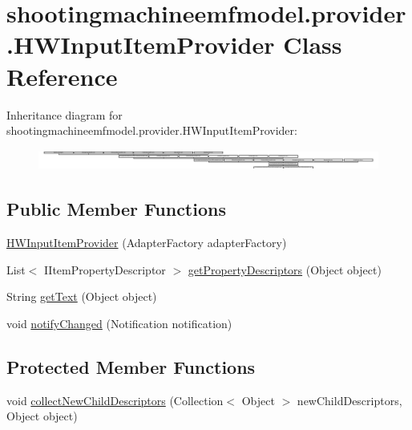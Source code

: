 \hypertarget{classshootingmachineemfmodel_1_1provider_1_1_h_w_input_item_provider}{\section{shootingmachineemfmodel.\-provider.\-H\-W\-Input\-Item\-Provider Class Reference}
\label{classshootingmachineemfmodel_1_1provider_1_1_h_w_input_item_provider}
}
Inheritance diagram for shootingmachineemfmodel.\-provider.\-H\-W\-Input\-Item\-Provider\-:\begin{figure}[H]
\begin{center}
\leavevmode
\includegraphics[height=0.680603cm]{classshootingmachineemfmodel_1_1provider_1_1_h_w_input_item_provider}
\end{center}
\end{figure}
\subsection*{Public Member Functions}
\begin{DoxyCompactItemize}
\item 
\hyperlink{classshootingmachineemfmodel_1_1provider_1_1_h_w_input_item_provider_ad5591776f8fd73d23f07be8a1ad4a013}{H\-W\-Input\-Item\-Provider} (Adapter\-Factory adapter\-Factory)
\item 
List$<$ I\-Item\-Property\-Descriptor $>$ \hyperlink{classshootingmachineemfmodel_1_1provider_1_1_h_w_input_item_provider_a716de08f65b1255d72fbbfcc6cfe3625}{get\-Property\-Descriptors} (Object object)
\item 
String \hyperlink{classshootingmachineemfmodel_1_1provider_1_1_h_w_input_item_provider_aca03270432bacce383e468467fcedf1c}{get\-Text} (Object object)
\item 
void \hyperlink{classshootingmachineemfmodel_1_1provider_1_1_h_w_input_item_provider_afa7d6ba4c193c477639134e7597a2305}{notify\-Changed} (Notification notification)
\end{DoxyCompactItemize}
\subsection*{Protected Member Functions}
\begin{DoxyCompactItemize}
\item 
void \hyperlink{classshootingmachineemfmodel_1_1provider_1_1_h_w_input_item_provider_a42590e3fc7f88cd4384b25ab7b058fd0}{collect\-New\-Child\-Descriptors} (Collection$<$ Object $>$ new\-Child\-Descriptors, Object object)
\end{DoxyCompactItemize}


